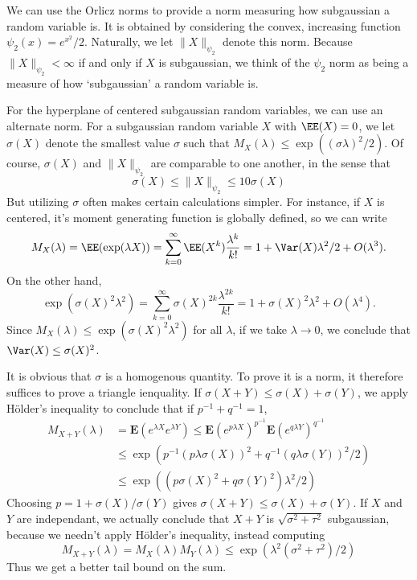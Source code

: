 We can use the Orlicz norms to provide a norm measuring how subgaussian a random variable is. It is obtained by considering the convex, increasing function $\psi_2(x) = e^{x^2}/2$. Naturally, we let $\| X \|_{\psi_2}$ denote this norm. Because $\| X \|_{\psi_2} < \infty$ if and only if $X$ is subgaussian, we think of the $\psi_2$ norm as being a measure of how `subgaussian' a random variable is.

For the hyperplane of centered subgaussian random variables, we can use an alternate norm. For a subgaussian random variable $X$ with $\EE(X) = 0$, we let $\sigma(X)$ denote the smallest value $\sigma$ such that $M_X(\lambda) \leq \exp((\sigma \lambda)^2/2)$. Of course, $\sigma(X)$ and $\| X \|_{\psi_2}$ are comparable to one another, in the sense that
%
\[ \sigma(X) \leq \| X \|_{\psi_2} \leq 10 \sigma(X) \]
%
But utilizing $\sigma$ often makes certain calculations simpler. For instance, if $X$ is centered, it's moment generating function is globally defined, so we can write
%
\[ M_X(\lambda) = \EE(\exp(\lambda X)) = \sum_{k = 0}^\infty \EE(X^k) \frac{\lambda^k}{k!} = 1 + \Var(X) \lambda^2/2 + O(\lambda^3). \]
%
On the other hand,
%
\[ \exp(\sigma(X)^2 \lambda^2) = \sum_{k = 0}^\infty \sigma(X)^{2k} \frac{\lambda^{2k}}{k!} = 1 + \sigma(X)^2 \lambda^2 + O(\lambda^4). \]
%
Since $M_X(\lambda) \leq \exp(\sigma(X)^2 \lambda^2)$ for all $\lambda$, if we take $\lambda \to 0$, we conclude that $\Var(X) \leq \sigma(X)^2$.

It is obvious that $\sigma$ is a homogenous quantity. To prove it is a norm, it therefore suffices to prove a triangle ienquality. If $\sigma(X+Y) \leq \sigma(X) + \sigma(Y)$, we apply H\"{o}lder's inequality to conclude that if $p^{-1} + q^{-1} = 1$,
%
\begin{align*}
    M_{X+Y}(\lambda) &= \mathbf{E}(e^{\lambda X} e^{\lambda Y}) \leq \mathbf{E}(e^{p \lambda X})^{p^{-1}} \mathbf{E}(e^{q \lambda Y})^{q^{-1}}\\
    &\leq \exp(p^{-1} (p \lambda \sigma(X))^2 + q^{-1} (q \lambda \sigma(Y))^2/2)\\
    &\leq \exp((p \sigma(X)^2 + q \sigma(Y)^2) \lambda^2/2)
\end{align*}
%
Choosing $p = 1 + \sigma(X)/\sigma(Y)$ gives $\sigma(X+Y) \leq \sigma(X) + \sigma(Y)$. If $X$ and $Y$ are independant, we actually conclude that $X + Y$ is $\sqrt{\sigma^2 + \tau^2}$ subgaussian, because we needn't apply H\"{o}lder's inequality, instead computing
%
\[ M_{X+Y}(\lambda) = M_X(\lambda) M_Y(\lambda) \leq \exp(\lambda^2 (\sigma^2 + \tau^2)/2) \]
%
Thus we get a better tail bound on the sum.

